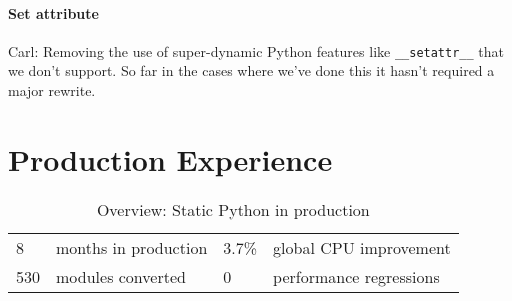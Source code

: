 \documentclass[english,cleveref,submission]{programming}
\newcommand{\SP}{Static Python}
\newcommand{\code}[1]{\texttt{#1}}
\begin{document}
\paragraph{Set attribute}

Carl: Removing the use of super-dynamic Python features like
\code{\_\_setattr\_\_} that we don’t support. So far in the cases where
we’ve done this it hasn’t required a major rewrite.


\section{Production Experience}
\label{s:eval}





\begin{table}
  \caption{Overview: \SP{} in production}
  \label{t:prod-stat}
  \begin{tabular}{l@{~~}ll@{~~}l}
    8     & months in production & 3.7\% & global CPU improvement \\
    530   & modules converted  &  0 & performance regressions
  \end{tabular}
\end{table}
\end{document}
